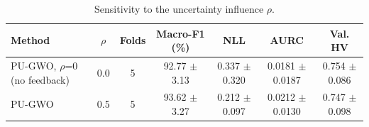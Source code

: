 \begin{table}[t]
\centering
\caption{Sensitivity to the uncertainty influence $\rho$.}
\label{tab:table7b_rho_sensitivity}
\small
\begin{tabular}{lcccccc}
\toprule
Method & $\rho$ & Folds & Macro-F1 (\%) & NLL & AURC & Val. HV \\
\midrule
PU-GWO, $\rho$=0 (no feedback) & 0.0 & 5 & 92.77 $\pm$ 3.13 & 0.337 $\pm$ 0.320 & 0.0181 $\pm$ 0.0187 & 0.754 $\pm$ 0.086 \\
PU-GWO & 0.5 & 5 & 93.62 $\pm$ 3.27 & 0.212 $\pm$ 0.097 & 0.0212 $\pm$ 0.0130 & 0.747 $\pm$ 0.098 \\
\bottomrule
\end{tabular}
\end{table}
